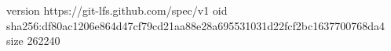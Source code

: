 version https://git-lfs.github.com/spec/v1
oid sha256:df80ac1206e864d47cf79cd21aa88e28a695531031d22fcf2bc1637700768da4
size 262240
